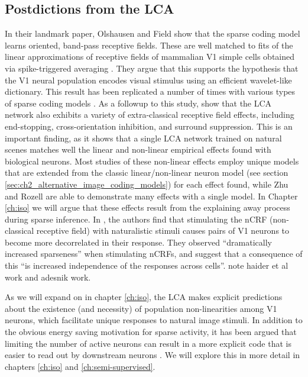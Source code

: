 \subsection{Postdictions from the LCA}
In their landmark paper, Olshausen and Field \citeyearpar{olshausen1996emergence} show that the sparse coding model learns oriented, band-pass receptive fields. These are well matched to fits of the linear approximations of receptive fields of mammalian V1 simple cells obtained via spike-triggered averaging \parencite{vanHateren1998independent}. They argue that this supports the hypothesis that the V1 neural population encodes visual stimulus using an efficient wavelet-like dictionary. This result has been replicated a number of times with various types of sparse coding models . As a followup to this study, \parencite{zhu2013visual} show that the LCA network also exhibits a variety of extra-classical receptive field effects, including end-stopping, cross-orientation inhibition, and surround suppression. This is an important finding, as it shows that a single LCA network trained on natural scenes matches well the linear and non-linear empirical effects found with biological neurons. Most studies of these non-linear effects employ unique models that are extended from the classic linear/non-linear neuron model (see section \ref{sec:ch2_alternative_image_coding_models}) for each effect found, while Zhu and Rozell are able to demonstrate many effects with a single model. In Chapter \ref{ch:iso} we will argue that these effects result from the explaining away process during sparse inference. In \citeyearpar{vinje2000sparse}, the authors find that stimulating the nCRF (non-classical receptive field) with naturalistic stimuli causes pairs of V1 neurons to become more decorrelated in their response. They observed ``dramatically increased sparseness'' when stimulating nCRFs, and suggest that a consequence of this ``is increased independence of the responses across cells''. note haider et al work and adesnik work.

As we will expand on in chapter \ref{ch:iso}, the LCA makes explicit predictions about the existence (and necessity) of population non-linearities among V1 neurons, which facilitate unique responses to natural image stimuli. In addition to the obvious energy saving motivation for sparse activity, it has been argued that limiting the number of active neurons can result in a more explicit code that is easier to read out by downstream neurons \parencite{olshasen2002principles}. We will explore this in more detail in chapters \ref{ch:iso} and \ref{ch:semi-supervised}.

